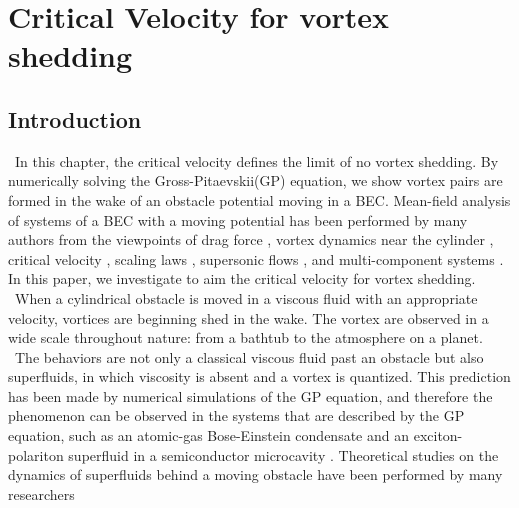 \documentclass[12pt,a4paper]{report} %
\begin{document}
\chapter{Critical Velocity for vortex shedding}
\section{Introduction}
\ In this chapter, the critical velocity defines the limit of no vortex shedding.
By numerically solving the Gross-Pitaevskii(GP) equation,
we show vortex pairs are formed in the wake of an obstacle potential moving in a BEC.
Mean-field analysis of systems of a BEC with a moving potential has been performed by 
many authors from the viewpoints of drag force \cite{19}\cite{20}\cite{21}, vortex dynamics near the cylinder \cite{22}\cite{23},
critical velocity \cite{24}, scaling laws \cite{25}, supersonic flows \cite{26}\cite{27}, and multi-component systems \cite{28}\cite{29}.
In this paper, we investigate to aim the critical velocity for vortex shedding.
\\
\ When a cylindrical obstacle is moved in a viscous fluid with an appropriate velocity,
vortices are beginning shed in the wake.
The vortex are observed in a wide scale throughout nature: from a bathtub to 
the atmosphere on a planet.
\ The behaviors are not only a classical viscous fluid past an obstacle but also superfluids,
in which viscosity is absent and a vortex is quantized. This prediction has been made by
numerical simulations of the GP equation, and therefore the phenomenon
can be observed in the systems that are described by the GP equation, such as an atomic-gas
Bose-Einstein condensate \cite{30} and an exciton-polariton superfluid in a 
semiconductor microcavity \cite{31}\cite{32}. Theoretical studies on the dynamics of superfluids behind a
moving obstacle have been performed by many researchers
\end{document}
